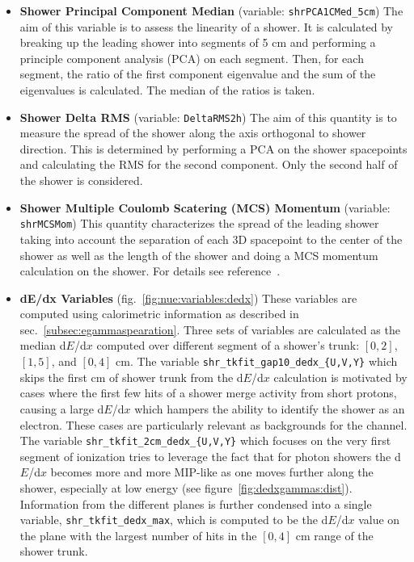 \begin{itemize}
    \item[] \textbf{Shower Principal Component Median} (variable: \texttt{shrPCA1CMed\_5cm}) The aim of this variable is to assess the linearity of a shower. It is calculated by breaking up the leading shower into segments of 5 cm and performing a principle component analysis (PCA) on each segment. Then, for each segment, the ratio of the first component eigenvalue and the sum of the eigenvalues is calculated. The median of the ratios is taken.
    \item[] \textbf{Shower Delta RMS} (variable: \texttt{DeltaRMS2h}) The aim of this quantity is to measure the spread of the shower along the axis orthogonal to shower direction. This is determined by performing a PCA on the shower spacepoints and calculating the RMS for the second component.
    Only the second half of the shower is considered.
    \item[] \textbf{Shower Multiple Coulomb Scatering (MCS) Momentum} (variable: \texttt{shrMCSMom}) This quantity characterizes the spread of the leading shower taking into account the separation of each 3D spacepoint to the center of the shower as well as the length of the shower and doing a MCS momentum calculation on the shower. For details see reference~\cite{bib:baller}.
    \item[] \textbf{dE/dx Variables} (fig.~\ref{fig:nue:variables:dedx}) These variables are computed using calorimetric information as described in sec.~\ref{subsec:egammaspearation}. Three sets of variables are calculated as the median d$E$/d$x$ computed over different segment of a shower's trunk: $[0,2]$, $[1,5]$, and $[0,4]$ cm. The variable \texttt{shr\_tkfit\_gap10\_dedx\_\{U,V,Y\}} which skips the first cm of shower trunk from the d$E$/d$x$ calculation is motivated by cases where the first few hits of a shower merge activity from short protons, causing a large d$E$/d$x$ which hampers the ability to identify the shower as an electron. These cases are particularly relevant as backgrounds for the \zpsel channel. The variable \texttt{shr\_tkfit\_2cm\_dedx\_\{U,V,Y\}} which focuses on the very first segment of ionization tries to leverage the fact that for photon showers the d$E$/d$x$ becomes more and more MIP-like as one moves further along the shower, especially at low energy (see figure~\ref{fig:dedxgammas:dist}). Information from the different planes is further condensed into a single variable, \texttt{shr\_tkfit\_dedx\_max}, which is computed to be the d$E$/d$x$ value on the plane with the largest number of hits in the $[0,4]$ cm range of the shower trunk.
\end{itemize}{}

